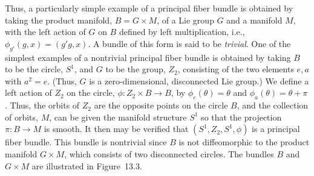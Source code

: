 

Thus, a particularly simple example of a principal fiber bundle is obtained by
taking the product manifold, \(B=G\times M\), of a Lie group \(G\) and a manifold
\(M\), with the left action of \(G\) on \(B\) defined by left multiplication, i.e.,
\(\phi_{g'}(g,x)=(g'g,x)\). A bundle of this form is said to be \emph{trivial}. One
of the simplest examples of a nontrivial principal fiber bundle is obtained by taking
\(B\) to be the circle, \(S^1\), and \(G\) to be the group, \(Z_2\), consisting of
the two elements \(e,a\) with \(a^2=e\). (Thus, \(G\) is a zero-dimensional,
disconnected Lie group.) We define a left action of \(Z_2\) on the circle,
\(\phi:Z_2\times B\longrightarrow B\), by \(\phi_e(\theta)=\theta\) and
\(\phi_a(\theta)=\theta+\pi\). Thus, the orbits of \(Z_2\) are the opposite points
on the circle \(B\), and the collection of orbits, \(M\), can be given the manifold
structure \(S^1\) so that the projection \(\pi:B\longrightarrow M\) is smooth. It
then may be verified that \((S^1,Z_2,S^1,\phi)\) is a principal fiber bundle. This
bundle is nontrivial since \(B\) is not diffeomorphic to the product manifold
\(G\times M\), which consists of two disconnected circles. The bundles \(B\) and
\(G\times M\) are illustrated in Figure~13.3.



